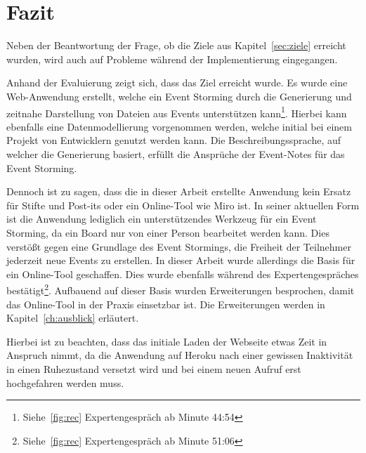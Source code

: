 \chapter{Fazit}\label{ch:fazit}

Neben der Beantwortung der Frage, ob die Ziele aus Kapitel~\ref{sec:ziele} erreicht wurden, wird auch auf Probleme während
der Implementierung eingegangen.

Anhand der Evaluierung zeigt sich, dass das Ziel erreicht wurde.
Es wurde eine Web-Anwendung erstellt, welche ein Event Storming durch die Generierung und zeitnahe Darstellung von Dateien aus Events unterstützen kann\footnote{Siehe~\ref{fig:rec} Expertengespräch ab Minute  44:54}.
Hierbei kann ebenfalls eine Datenmodellierung vorgenommen werden, welche initial bei einem Projekt von Entwicklern genutzt werden kann.
Die Beschreibungssprache, auf welcher die Generierung basiert, erfüllt die Ansprüche der Event-Notes für das Event Storming.

Dennoch ist zu sagen, dass die in dieser Arbeit erstellte Anwendung kein Ersatz für Stifte und Post-its oder ein Online-Tool wie Miro ist.
In seiner aktuellen Form ist die Anwendung lediglich ein unterstützendes Werkzeug für ein Event Storming, da ein Board nur von einer Person bearbeitet werden kann.
Dies verstößt gegen eine Grundlage des Event Stormings, die Freiheit der Teilnehmer jederzeit neue Events zu erstellen.
In dieser Arbeit wurde allerdings die Basis für ein Online-Tool geschaffen.
Dies wurde ebenfalls während des Expertengespräches bestätigt\footnote{Siehe~\ref{fig:rec} Expertengespräch ab Minute  51:06}.
Aufbauend auf dieser Basis wurden Erweiterungen besprochen, damit das Online-Tool in der Praxis einsetzbar ist.
Die Erweiterungen werden in Kapitel~\ref{ch:ausblick} erläutert.

Hierbei ist zu beachten, dass das initiale Laden der Webseite etwas Zeit in Anspruch nimmt, da die Anwendung auf Heroku nach einer gewissen
Inaktivität in einen Ruhezustand versetzt wird und bei einem neuen Aufruf erst hochgefahren werden muss.

